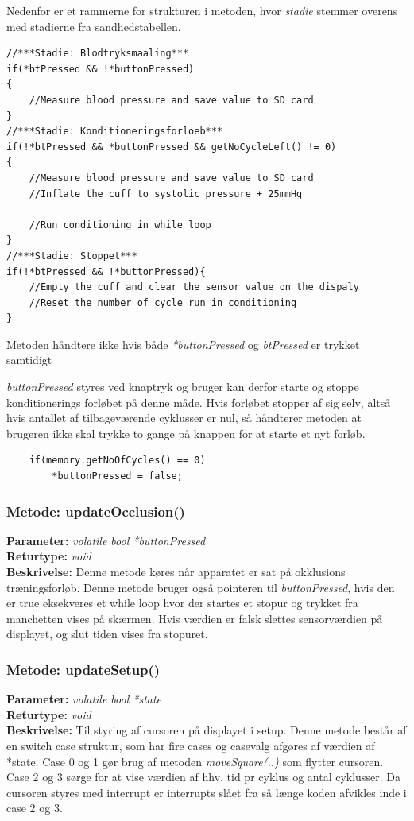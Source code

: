 Nedenfor er et rammerne for strukturen i metoden, hvor \textit{stadie} stemmer overens med stadierne fra sandhedstabellen. 

\begin{lstlisting}
//***Stadie: Blodtryksmaaling***
if(*btPressed && !*buttonPressed)
{
	//Measure blood pressure and save value to SD card
}
//***Stadie: Konditioneringsforloeb***
if(!*btPressed && *buttonPressed && getNoCycleLeft() != 0)
{
	//Measure blood pressure and save value to SD card
	//Inflate the cuff to systolic pressure + 25mmHg
	
	//Run conditioning in while loop 
}
//***Stadie: Stoppet***
if(!*btPressed && !*buttonPressed){
	//Empty the cuff and clear the sensor value on the dispaly 
	//Reset the number of cycle run in conditioning
}

\end{lstlisting}

Metoden håndtere ikke hvis både \textit{*buttonPressed} og \textit{btPressed} er trykket samtidigt

\textit{buttonPressed} styres ved knaptryk og bruger kan derfor starte og stoppe konditionerings forløbet på denne måde. Hvis forløbet stopper af sig selv, altså hvis antallet af tilbageværende cyklusser er nul, så håndterer metoden at brugeren ikke skal trykke to gange på knappen for at starte et nyt forløb. 
\begin{lstlisting}
	if(memory.getNoOfCycles() == 0)
		*buttonPressed = false;
\end{lstlisting}

\subsubsection{Metode: updateOcclusion()}
\textbf{Parameter: } \textit{volatile bool *buttonPressed}
\\ \textbf{Returtype: } \textit{void}
\\ \textbf{Beskrivelse: } Denne metode køres når apparatet er sat på okklusions træningsforløb. Denne metode bruger også pointeren til \textit{buttonPressed}, hvis den er true eksekveres et while loop hvor der startes et stopur og trykket fra manchetten vises på skærmen. Hvis værdien er falsk slettes sensorværdien på displayet, og slut tiden vises fra stopuret.

\subsubsection{Metode: updateSetup()}
\textbf{Parameter: } \textit{volatile bool *state}
\\ \textbf{Returtype: } \textit{void}
\\ \textbf{Beskrivelse: } Til styring af cursoren på displayet i setup. Denne metode består af en switch case struktur, som har fire cases og casevalg afgøres af værdien af *state. Case 0 og 1 gør brug af metoden \textit{moveSquare(..)} som flytter cursoren. Case 2 og 3 sørge for at vise værdien af hhv. tid pr cyklus og antal cyklusser. Da cursoren styres med interrupt er interrupts slået fra så længe koden afvikles inde i case 2 og 3. 

